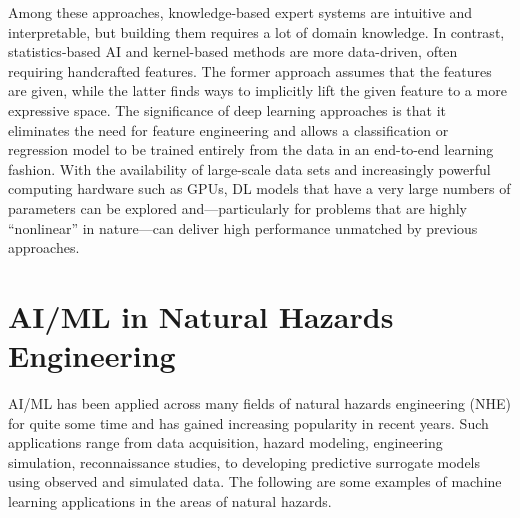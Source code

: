 Among these approaches, knowledge-based expert systems are intuitive and interpretable, but building them requires a lot of domain knowledge. In contrast, statistics-based AI and kernel-based methods are more data-driven, often requiring handcrafted features. The former approach assumes that the features are given, while the latter finds ways to implicitly lift the given feature to a more expressive space. The significance of deep learning approaches is that it eliminates the need for feature engineering and allows a classification or regression model to be trained entirely from the data in an end-to-end learning fashion. With the availability of large-scale data sets and increasingly powerful computing hardware such as GPUs, DL models that have a very large numbers of parameters can be explored and—particularly for problems that are highly ``nonlinear'' in nature—can deliver high performance unmatched by previous approaches.

\section{AI/ML in Natural Hazards Engineering}
\label{sec:ai_nathaz}

AI/ML has been applied across many fields of natural hazards engineering (NHE) for quite some time and has gained increasing popularity in recent years. Such applications range from data acquisition, hazard modeling, engineering simulation, reconnaissance studies, to developing predictive surrogate models using observed and simulated data. The following are some examples of machine learning applications in the areas of natural hazards.

